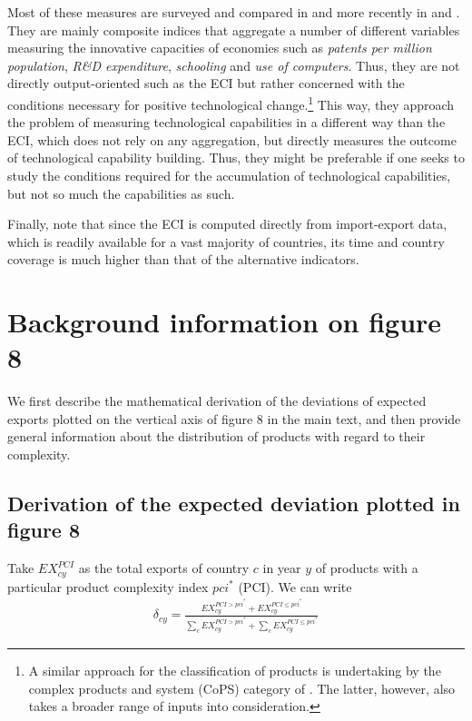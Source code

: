 \documentclass[11pt,a4paper]{article}
\begin{document}
Most of these measures are surveyed and compared in \citet{Archibugi:2005iu} and more recently in \citet{Archibugi:2009bf} and \citet{Felipe:2012fv}.
They are mainly composite indices that aggregate a number of different variables measuring the innovative capacities of economies such as \textit{patents per million population}, \textit{R\&D expenditure}, \textit{schooling} and \textit{use of computers}.
Thus, they are not directly output-oriented such as the ECI but rather concerned with the conditions necessary for positive technological change.\footnote{A similar approach for the classification of products is undertaking by the complex products and system (CoPS) category of \citet{Hobday:2000hx}. The latter, however, also takes a broader range of inputs into consideration.}
This way, they approach the problem of measuring technological capabilities in a different way than the ECI, which does not rely on any aggregation, but directly measures the outcome of technological capability building.
Thus, they might be preferable if one seeks to study the conditions required for the accumulation of technological capabilities, but not so much the capabilities as such.

Finally, note that since the ECI is computed directly from import-export data, which is readily available for a vast majority of countries, its time and country coverage is much higher than that of the alternative indicators.

\newpage
\section{Background information on figure 8}
\label{ap:robust}
We first describe the mathematical derivation of the deviations of expected exports plotted on the vertical axis of figure 8 in the main text,
and then provide general information about the distribution of products with regard to their complexity.

\subsection{Derivation of the expected deviation plotted in figure 8}

Take $EX_{cy}^{PCI}$ as the total exports of country $c$ in year $y$ of products with a particular product complexity index $pci^*$ (PCI).
We can write 
\begin{align}
\delta_{cy} = \frac{EX_{cy}^{PCI>pci^*} + EX_{cy}^{PCI\leq pci^*}}{\sum_c EX_{cy}^{PCI>pci^*} + \sum_c EX_{cy}^{PCI\leq pci^*}}
\end{align}
\end{document}
